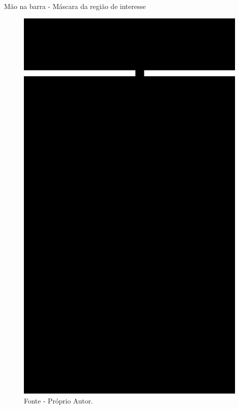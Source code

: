 \begin{frame}{Mão na barra - Máscara da região de interesse}
    \begin{figure}[!ht]
    \centering
    \includegraphics[scale=0.1]{img/desenvolvimento/maoBarra/mask3.png}
    \caption*{Fonte - Próprio Autor.}
    \end{figure}
\end{frame}

